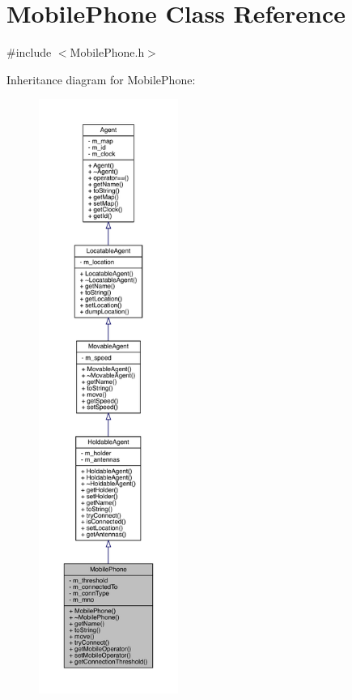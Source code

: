 \hypertarget{class_mobile_phone}{}\section{Mobile\+Phone Class Reference}
\label{class_mobile_phone}


{\ttfamily \#include $<$Mobile\+Phone.\+h$>$}



Inheritance diagram for Mobile\+Phone\+:\nopagebreak
\begin{figure}[H]
\begin{center}
\leavevmode
\includegraphics[height=550pt]{class_mobile_phone__inherit__graph}
\end{center}
\end{figure}


